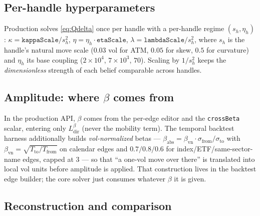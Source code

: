 \documentclass[11pt]{article}
\newcommand{\Ldir}{L_{\mathrm{dir}}}
\begin{document}
\subsection{Per-handle hyperparameters}

Production solves \eqref{eq:Qdelta} once per handle with a per-handle regime
$(s_h,\eta_h)$: $\kappa=\texttt{kappaScale}/s_h^2$,
$\eta=\eta_h\cdot\texttt{etaScale}$,
$\lambda=\texttt{lambdaScale}/s_h^2$, where $s_h$ is the handle's natural move
scale ($0.03$ vol for ATM, $0.05$ for skew, $0.5$ for curvature) and $\eta_h$
its base coupling ($2\!\times\!10^4$, $7\!\times\!10^3$, $70$). Scaling by
$1/s_h^2$ keeps the \emph{dimensionless} strength of each belief comparable
across handles.

\subsection{Amplitude: where $\beta$ comes from}

In the production API, $\beta$ comes from the per-edge editor and the
\texttt{crossBeta} scalar, entering only $\Ldir^{\beta}$ (never the mobility
term). The temporal backtest harness additionally builds \emph{vol-normalized}
betas --- $\beta_{\text{abs}}=\beta_{\text{vn}}\cdot\sigma_{\text{from}}/
\sigma_{\text{to}}$ with $\beta_{\text{vn}}=\sqrt{T_{\text{to}}/T_{\text{from}}}$
on calendar edges and $0.7/0.8/0.6$ for index/ETF/same-sector-name edges,
capped at $3$ --- so that ``a one-vol move over there'' is translated into local
vol units before amplitude is applied. That construction lives in the backtest
edge builder; the core solver just consumes whatever $\beta$ it is given.

\subsection{Reconstruction and comparison}
\end{document}
